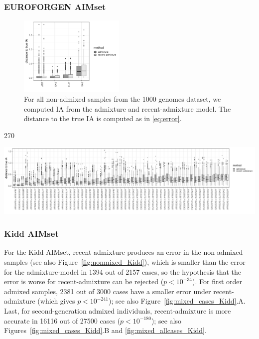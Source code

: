 \documentclass[12pt]{article}
\theoremstyle{definition}
\begin{document}
\subsubsection*{EUROFORGEN AIMset}

\begin{figure}[H]
  \begin{center}
    \includegraphics[width=0.45\textwidth]{deviations_nonmixed_EUROFORGEN.pdf}
  \end{center}
  \caption{\label{fig:nonmixed_EUROFORGEN} For all non-admixed samples
    from the 1000 genomes dataset, we computed IA from the admixture
    and recent-admixture model. The distance to the true IA is
    computed as in \eqref{eq:error}.}
\end{figure}

\begin{center}
  \begin{turn}{270}%
    \begin{minipage}{\textheight}
      \includegraphics[width=\textwidth]{deviations_mixed_allcases_EUROFORGEN.pdf}
      \label{fig:mixed_allcases_EUROFORGEN}
    \end{minipage}
  \end{turn}  
\end{center}
       
\subsubsection*{Kidd AIMset}
For the Kidd AIMset, recent-admixture produces an error in the
non-admixed samples (see also Figure~\ref{fig:nonmixed_Kidd}), which
is smaller than the error for the admixture-model in 1394 out of 2157
cases, so the hypothesis that the error is worse for recent-admixture
can be rejected ($p<10^{-34}$). For first order admixed samples, 2381
out of 3000 cases have a smaller error under recent-admixture (which
gives $p<10^{-241}$); see also
Figure~\ref{fig:mixed_cases_Kidd}.A. Last, for second-generation
admixed individuals, recent-admixture is more accurate in 16116 out of
27500 cases ($p<10^{-180}$); see also
Figures~\ref{fig:mixed_cases_Kidd}.B and
\ref{fig:mixed_allcases_Kidd}.
\end{document}
